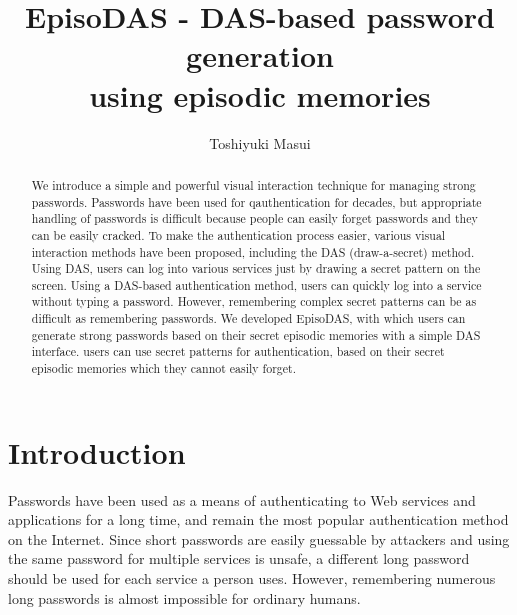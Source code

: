 \documentclass[sigconf]{acmart}
\begin{document}
\title{EpisoDAS - DAS-based password generation \\
using episodic memories}

\author{Toshiyuki Masui}

\renewcommand{\shortauthors}{T. Masui}

\begin{abstract}

We introduce a simple and powerful visual interaction technique for
managing strong passwords.
%
Passwords have been used for qauthentication for decades, but
appropriate handling of passwords is difficult because people can
easily forget passwords and they can be easily cracked.
%
To make the authentication process easier, various visual interaction
methods have been proposed, including the DAS (draw-a-secret)
method. Using DAS, users can log into various services just by drawing
a secret pattern on the screen.
%
Using a DAS-based authentication method, users can quickly log into a
service without typing a password. However, remembering complex secret
patterns can be as difficult as remembering passwords. We developed
EpisoDAS, with which users can generate strong passwords based on
their secret episodic memories with a simple DAS interface.
%
users can use secret patterns for authentication, based on their
secret episodic memories which they cannot easily forget.

\end{abstract}

\maketitle

\section{Introduction}

Passwords have been used as a means of authenticating to Web services
and applications for a long time, and remain the most popular
authentication method on the Internet.
Since short passwords are easily guessable by attackers and using the
same password for multiple services is unsafe, a different long
password should be used for each service a person uses.
However, remembering numerous long passwords is almost impossible for
ordinary humans.
\end{document}

